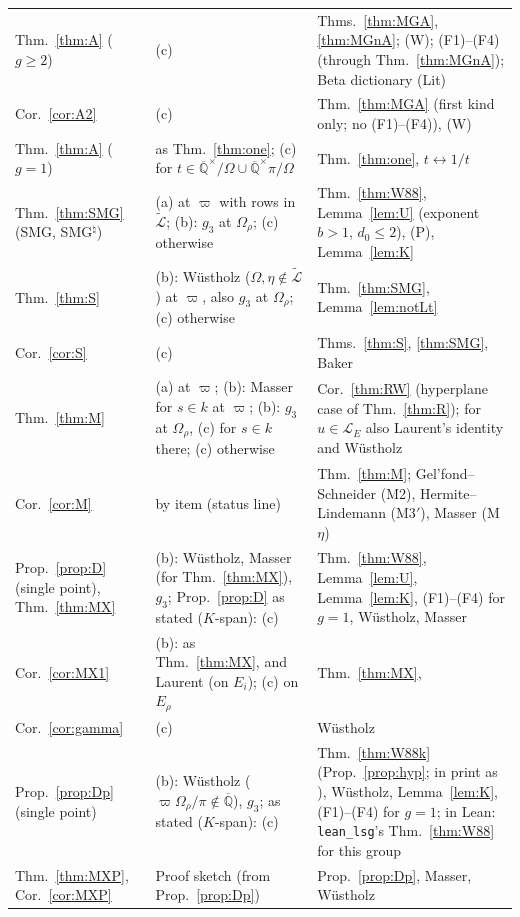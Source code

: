 \documentclass[11pt]{amsart}
\theoremstyle{definition}
\newcommand{\Qb}{\overline{\mathbb{Q}}}
\newcommand{\Lg}{\mathcal{L}}
\newcommand{\Lt}{\widetilde{\mathcal{L}}}
\newcommand{\vp}{\varpi}
\newif\ifformallabels \formallabelstrue
\newcommand{\TierA}{\ifformallabels(a)\else(c)\fi}
\newcommand{\TierB}{\ifformallabels(b)\else(c)\fi}
\begin{document}
{\begin{longtable}{>{\raggedright\arraybackslash}p{3.3cm}>{\raggedright\arraybackslash}p{4.4cm}>{\raggedright\arraybackslash}p{6.2cm}}
Thm.~\ref{thm:A} ($g\ge2$) & (c) & Thms.~\ref{thm:MGA}, \ref{thm:MGnA}; (W); (F1)--(F4) (through Thm.~\ref{thm:MGnA}); Beta dictionary (Lit)\\
Cor.~\ref{cor:A2} & (c) & Thm.~\ref{thm:MGA} (first kind only; no (F1)--(F4)), (W)\\
Thm.~\ref{thm:A} ($g=1$) & as Thm.~\ref{thm:one}; (c) for $t\in\Qb^\times/\Omega\cup\Qb^\times\pi/\Omega$ & Thm.~\ref{thm:one}, $t\leftrightarrow1/t$\\
Thm.~\ref{thm:SMG} (SMG, SMG$^\natural$) & \TierA{} at $\vp$ with rows in $\Lt$; \TierB: $g_3$ at $\Omega_\rho$; (c) otherwise & Thm.~\ref{thm:W88}, Lemma~\ref{lem:U} (exponent $b>1$, $d_0\le2$), (P), Lemma~\ref{lem:K}\\
Thm.~\ref{thm:S} & \TierB: W\"ustholz ($\Omega,\eta\notin\Lt$) at $\vp$, also $g_3$ at $\Omega_\rho$; (c) otherwise & Thm.~\ref{thm:SMG}, Lemma~\ref{lem:notLt}\\
Cor.~\ref{cor:S} & (c) & Thms.~\ref{thm:S}, \ref{thm:SMG}, Baker\\
Thm.~\ref{thm:M} & \TierA{} at $\vp$; \TierB: Masser for $s\in k$ at $\vp$; \TierB: $g_3$ at $\Omega_\rho$, (c) for $s\in k$ there; (c) otherwise & Cor.~\ref{thm:RW} (hyperplane case of Thm.~\ref{thm:R}); for $u\in\Lg_E$ also Laurent's identity and W\"ustholz\\
Cor.~\ref{cor:M} & by item (status line) & Thm.~\ref{thm:M}; Gel'fond--Schneider (M2), Hermite--Lindemann (M3$'$), Masser (M$\eta$)\\
Prop.~\ref{prop:D} (single point), Thm.~\ref{thm:MX} & \TierB: W\"ustholz, Masser (for Thm.~\ref{thm:MX}), $g_3$; Prop.~\ref{prop:D} as stated ($K$-span): (c) & Thm.~\ref{thm:W88}, Lemma~\ref{lem:U}, Lemma~\ref{lem:K}, (F1)--(F4) for $g=1$, W\"ustholz, Masser\\
Cor.~\ref{cor:MX1} & \TierB: as Thm.~\ref{thm:MX}, and Laurent (on $E_i$); (c) on $E_\rho$ & Thm.~\ref{thm:MX}, \cite{La80}\\
Cor.~\ref{cor:gamma} & (c) & W\"ustholz\\
Prop.~\ref{prop:Dp} (single point) & \TierB: W\"ustholz ($\vp\Omega_\rho/\pi\notin\Qb$), $g_3$; as stated ($K$-span): (c) & Thm.~\ref{thm:W88k} (Prop.~\ref{prop:hyp}; in print as \cite[\S5d]{W88}), W\"ustholz, Lemma~\ref{lem:K}, (F1)--(F4) for $g=1$; in Lean: \texttt{lean\_lsg}'s Thm.~\ref{thm:W88} for this group\\
Thm.~\ref{thm:MXP}, Cor.~\ref{cor:MXP} & Proof sketch (from Prop.~\ref{prop:Dp}) & Prop.~\ref{prop:Dp}, Masser, W\"ustholz\\

\end{longtable}}
\end{document}
